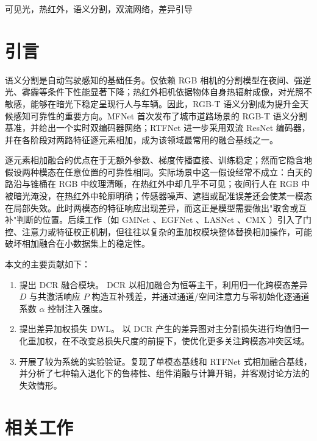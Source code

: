\documentclass[10pt,conference]{IEEEtran}
\begin{document}
\begin{IEEEkeywords}
可见光，热红外，语义分割，双流网络，差异引导
\end{IEEEkeywords}

\section{引言}

语义分割是自动驾驶感知的基础任务。仅依赖 RGB 相机的分割模型在夜间、强逆光、雾霾等条件下性能显著下降；热红外相机依据物体自身热辐射成像，对光照不敏感，能够在暗光下稳定呈现行人与车辆。因此，RGB-T 语义分割成为提升全天候感知可靠性的重要方向。MFNet \cite{b1} 首次发布了城市道路场景的 RGB-T 语义分割基准，并给出一个实时双编码器网络；RTFNet \cite{b2} 进一步采用双流 ResNet \cite{b3} 编码器，并在各阶段对两路特征逐元素相加，成为该领域最常用的融合基线之一。

逐元素相加融合的优点在于无额外参数、梯度传播直接、训练稳定；然而它隐含地假设两种模态在任意位置的可靠性相同。实际场景中这一假设经常不成立：白天的路沿与锥桶在 RGB 中纹理清晰，在热红外中却几乎不可见；夜间行人在 RGB 中被暗光淹没，在热红外中轮廓明确；传感器噪声、遮挡或配准误差还会使某一模态在局部失效。此时两模态的特征响应出现差异，而这正是模型需要做出"取舍或互补"判断的位置。后续工作（如 GMNet \cite{b5}、EGFNet \cite{b6}、LASNet \cite{b7}、CMX \cite{b8}）引入了门控、注意力或特征校正机制，但往往以复杂的重加权模块整体替换相加操作，可能破坏相加融合在小数据集上的稳定性。



本文的主要贡献如下：

\begin{enumerate}
    \item 提出 DCR 融合模块。 DCR 以相加融合为恒等主干，利用归一化跨模态差异 $D$ 与共激活响应 $P$ 构造互补残差，并通过通道/空间注意力与零初始化逐通道系数 $\alpha$ 控制注入强度。
    \item 提出差异加权损失 DWL。 以 DCR 产生的差异图对主分割损失进行均值归一化重加权，在不改变总损失尺度的前提下，使优化更多关注跨模态冲突区域。
    \item 开展了较为系统的实验验证。复现了单模态基线和 RTFNet 式相加融合基线，并分析了七种输入退化下的鲁棒性、组件消融与计算开销，并客观讨论方法的失效情形。
\end{enumerate}





\section{相关工作}
\end{document}

